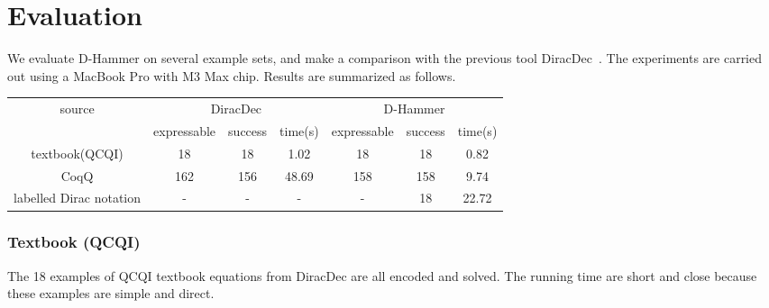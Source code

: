 \section{Evaluation}
We evaluate D-Hammer on several example sets, and make a comparison with the previous tool DiracDec~\cite{diracdec}.
The experiments are carried out using a MacBook Pro with M3 Max chip. Results are summarized as follows.

{
    \center
    \begin{tabular}{c|c c c|c c c}
        \hline
        \multirow{2}{*}{source} & \multicolumn{3}{c|}{DiracDec} & \multicolumn{3}{c}{D-Hammer} \\
        \cline{2-7}
                                 & expressable & success & time(s)           & expressable & success & time(s)                 \\
        \hline
        textbook(QCQI)          & 18          & 18        &    1.02        &    18      & 18          &   0.82      \\
        CoqQ                    & 162          & 156       &    48.69       &   158     &  158   &     9.74     \\
        labelled Dirac notation      &   -         &   -          &     -           &      -      &        18       &     22.72    \\
        \hline
    \end{tabular}        
}

\subsubsection{Textbook (QCQI)}
The 18 examples of QCQI textbook equations from DiracDec are all encoded and solved. The running time are short and close because these examples are simple and direct.


